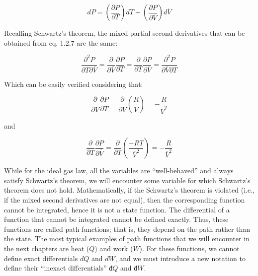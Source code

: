 \documentclass[
  9pt,
]{extbook}
\theoremstyle{definition}
\theoremstyle{definition}
\theoremstyle{definition}
\theoremstyle{remark}
\begin{document}
\begin{equation}
  dP=\left( \frac{\partial P}{\partial T} \right)dT + \left( \frac{\partial P}{\partial \overline{V}} \right)d\overline{V}
  \label{eq:totaldifferentialP}
\end{equation}

Recalling Schwartz's theorem, the mixed partial second derivatives that can be obtained from eq. 1.2.7 are the same:

\begin{equation}
  \frac{\partial^2 P}{\partial T \partial \overline{V}}=\frac{\partial}{\partial \overline{V}}\frac{\partial P}{\partial T}=\frac{\partial}{\partial T}\frac{\partial P}{\partial \overline{V}}=\frac{\partial^2 P}{\partial \overline{V} \partial T}
  \label{eq:schwartzP}
\end{equation}

Which can be easily verified considering that:

\begin{equation}
  \frac{\partial}{\partial \overline{V}} \frac{\partial P}{\partial T}  = \frac{\partial}{\partial \overline{V}} \left(\frac{R}{\overline{V}}\right) = -\frac{R}{\overline{V}^2} 
  \label{eq:secondderPA}
\end{equation}

and

\begin{equation}
  \frac{\partial}{\partial T} \frac{\partial P}{\partial \overline{V}}  = \frac{\partial}{\partial T} \left(\frac{-RT}{\overline{V}^2}\right) = -\frac{R}{\overline{V}^2} 
  \label{eq:secondderPB}
\end{equation}

While for the ideal gas law, all the variables are ``well-behaved'' and always satisfy Schwartz's theorem, we will encounter some variable for which Schwartz's theorem does not hold. Mathematically, if the Schwartz's theorem is violated (i.e., if the mixed second derivatives are not equal), then the corresponding function cannot be integrated, hence it is not a state function. The differential of a function that cannot be integrated cannot be defined exactly. Thus, these functions are called path functions; that is, they depend on the path rather than the state. The most typical examples of path functions that we will encounter in the next chapters are heat (\(Q\)) and work (\(W\)). For these functions, we cannot define exact differentials \(dQ\) and \(dW\), and we must introduce a new notation to define their ``inexact differentials'' \(đ Q\) and \(đ W\).
\end{document}
